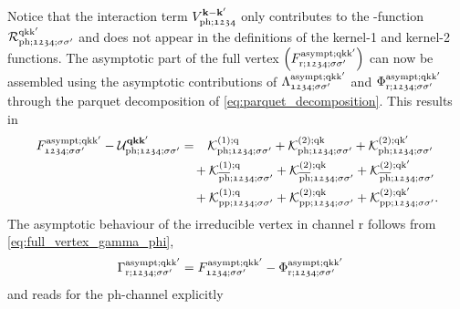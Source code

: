 \documentclass[../../main.tex]{subfiles}
\begin{document}
Notice that the interaction term $V^{\textbf{k}-\textbf{k}'}_{\text{ph};\mathfrak{1234}}$ only contributes to the -function $\mathcal{R}^{\text{q}\text{k}\text{k}'}_{\text{ph};\mathfrak{1234};\sigma\sigma'}$ and does not appear in the definitions of the kernel-1 and kernel-2 functions. The asymptotic part of the full vertex $\left (F_{\text{r};\mathfrak{1234};\sigma\sigma'}^{\text{asympt};\text{q}\text{k}\text{k}'}\right )$ can now be assembled using the asymptotic contributions of $\Lambda^{\text{asympt};\text{q}\text{k}\text{k}'}_{\mathfrak{1234};\sigma\sigma'}$ and $\Phi_{\text{r};\mathfrak{1234};\sigma\sigma'}^{\text{asympt};\text{q}\text{k}\text{k}'}$ through the parquet decomposition of \eqref{eq:parquet_decomposition}. This results in
\begin{align}
\begin{split}
	F_{\mathfrak{1234};\sigma\sigma'}^{\text{asympt};\text{q}\text{k}\text{k}'}-\mathcal{U}^{\textbf{qkk}'}_{\text{ph};\mathfrak{1234};\sigma\sigma'}&=\phantom{+}\mathcal{K}^{(1);\text{q}}_{\text{ph};\mathfrak{1234};\sigma\sigma'} + \mathcal{K}^{(2);\text{q}\text{k}}_{\text{ph};\mathfrak{1234};\sigma\sigma'}+\mathcal{K}^{(2);\text{q}\text{k}'}_{\text{ph};\mathfrak{1234};\sigma\sigma'}\\
	&\quad+\mathcal{K}^{(1);\text{q}}_{\overline{\text{ph}};\mathfrak{1234};\sigma\sigma'} + \mathcal{K}^{(2);\text{q}\text{k}}_{\overline{\text{ph}};\mathfrak{1234};\sigma\sigma'}+\mathcal{K}^{(2);\text{q}\text{k}'}_{\overline{\text{ph}};\mathfrak{1234};\sigma\sigma'}\\
	&\quad+\mathcal{K}^{(1);\text{q}}_{\text{pp};\mathfrak{1234};\sigma\sigma'} + \mathcal{K}^{(2);\text{q}\text{k}}_{\text{pp};\mathfrak{1234};\sigma\sigma'}+\mathcal{K}^{(2);\text{q}\text{k}'}_{\text{pp};\mathfrak{1234};\sigma\sigma'}.
\end{split}
\end{align}
The asymptotic behaviour of the irreducible vertex in channel r follows from \eqref{eq:full_vertex_gamma_phi},
\begin{align}
	\Gamma_{\text{r};\mathfrak{1234};\sigma\sigma'}^{\text{asympt};\text{q}\text{k}\text{k}'}&=F_{\mathfrak{1234};\sigma\sigma'}^{\text{asympt};\text{q}\text{k}\text{k}'}-\Phi_{\text{r};\mathfrak{1234};\sigma\sigma'}^{\text{asympt};\text{q}\text{k}\text{k}'}
\end{align}
and reads for the ph-channel explicitly
\end{document}
